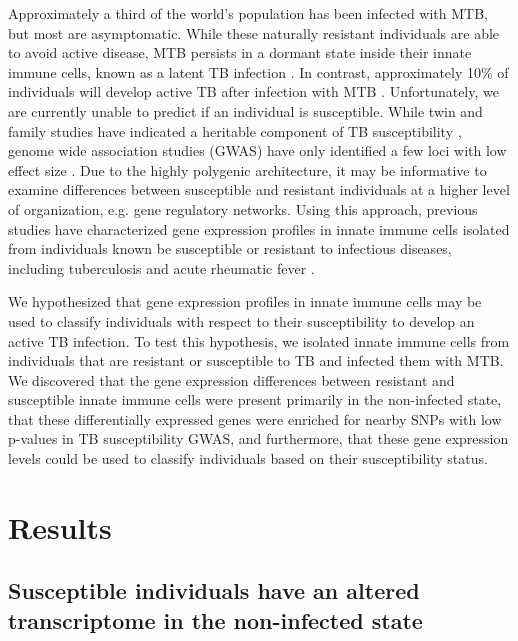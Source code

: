 Approximately a third of the world's population has been infected with
MTB, but most are asymptomatic. While these naturally resistant
individuals are able to avoid active disease, MTB persists in a
dormant state inside their innate immune cells, known as a latent TB
infection \citep{Munoz2015}. In contrast, approximately 10\% of
individuals will develop active TB after infection with MTB
\citep{North2004, OGarra2013}. Unfortunately, we are currently unable
to predict if an individual is susceptible. While twin and family
studies have indicated a heritable component of TB susceptibility
\citep{Kallmann1943, Comstock1978, Cobat2010, Moller2010}, genome wide
association studies (GWAS) have only identified a few loci with low
effect size \citep{Thye2010, Mahasirimongkol2012, Thye2012, Png2012,
Chimusa2014, Curtis2015, Sobota2016}. Due to the highly polygenic
architecture, it may be informative to examine differences between
susceptible and resistant individuals at a higher level of
organization, e.g. gene regulatory networks. Using this approach,
previous studies have characterized gene expression profiles in innate
immune cells isolated from individuals known be susceptible or
resistant to infectious diseases, including tuberculosis
\citep{Thuong2008} and acute rheumatic fever \citep{Bryant2014}.

We hypothesized that gene expression profiles in innate immune cells
may be used to classify individuals with respect to their
susceptibility to develop an active TB infection. To test this
hypothesis, we isolated innate immune cells from individuals that are
resistant or susceptible to TB and infected them with MTB. We
discovered that the gene expression differences between resistant and
susceptible innate immune cells were present primarily in the
non-infected state, that these differentially expressed genes were
enriched for nearby SNPs with low p-values in TB susceptibility GWAS,
and furthermore, that these gene expression levels could be used to
classify individuals based on their susceptibility status.

\section{Results}

\subsection{Susceptible individuals have an altered transcriptome in the non-infected state}

